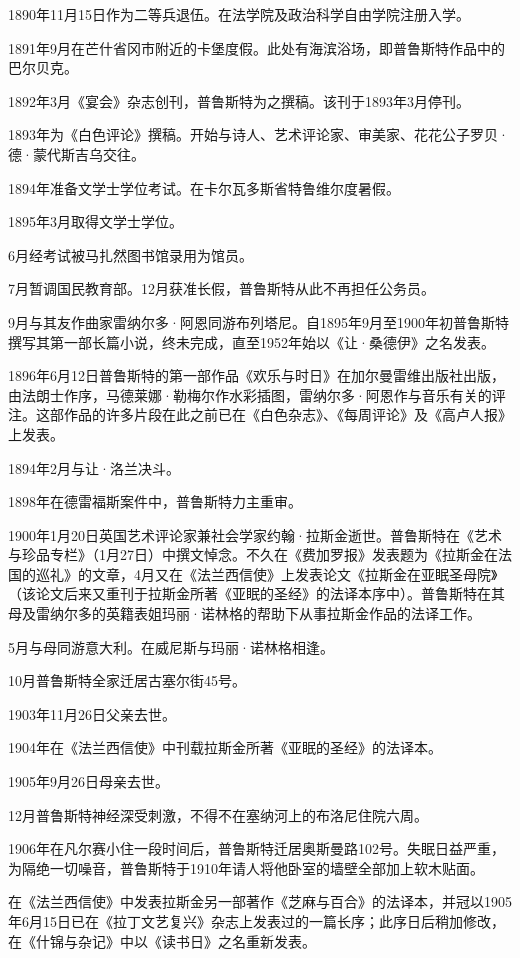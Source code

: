 \par 1890年11月15日作为二等兵退伍。在法学院及政治科学自由学院注册入学。
\par 1891年9月在芒什省冈市附近的卡堡度假。此处有海滨浴场，即普鲁斯特作品中的巴尔贝克。
\par 1892年3月《宴会》杂志创刊，普鲁斯特为之撰稿。该刊于1893年3月停刊。
\par 1893年为《白色评论》撰稿。开始与诗人、艺术评论家、审美家、花花公子罗贝·德·蒙代斯吉乌交往。
\par 1894年准备文学士学位考试。在卡尔瓦多斯省特鲁维尔度暑假。
\par 1895年3月取得文学士学位。
\par 6月经考试被马扎然图书馆录用为馆员。
\par 7月暂调国民教育部。12月获准长假，普鲁斯特从此不再担任公务员。
\par 9月与其友作曲家雷纳尔多·阿恩同游布列塔尼。自1895年9月至1900年初普鲁斯特撰写其第一部长篇小说，终未完成，直至1952年始以《让·桑德伊》之名发表。
\par 1896年6月12日普鲁斯特的第一部作品《欢乐与时日》在加尔曼雷维出版社出版，由法朗士作序，马德莱娜·勒梅尔作水彩插图，雷纳尔多·阿恩作与音乐有关的评注。这部作品的许多片段在此之前已在《白色杂志》、《每周评论》及《高卢人报》上发表。
\par 1894年2月与让·洛兰决斗。
\par 1898年在德雷福斯案件中，普鲁斯特力主重审。
\par 1900年1月20日英国艺术评论家兼社会学家约翰·拉斯金逝世。普鲁斯特在《艺术与珍品专栏》（1月27日）中撰文悼念。不久在《费加罗报》发表题为《拉斯金在法国的巡礼》的文章，4月又在《法兰西信使》上发表论文《拉斯金在亚眠圣母院》（该论文后来又重刊于拉斯金所著《亚眠的圣经》的法译本序中）。普鲁斯特在其母及雷纳尔多的英籍表姐玛丽·诺林格的帮助下从事拉斯金作品的法译工作。
\par 5月与母同游意大利。在威尼斯与玛丽·诺林格相逢。
\par 10月普鲁斯特全家迁居古塞尔街45号。
\par 1903年11月26日父亲去世。
\par 1904年在《法兰西信使》中刊载拉斯金所著《亚眠的圣经》的法译本。
\par 1905年9月26日母亲去世。
\par 12月普鲁斯特神经深受刺激，不得不在塞纳河上的布洛尼住院六周。
\par 1906年在凡尔赛小住一段时间后，普鲁斯特迁居奥斯曼路102号。失眠日益严重，为隔绝一切噪音，普鲁斯特于1910年请人将他卧室的墙壁全部加上软木贴面。
\par 在《法兰西信使》中发表拉斯金另一部著作《芝麻与百合》的法译本，并冠以1905年6月15日已在《拉丁文艺复兴》杂志上发表过的一篇长序；此序日后稍加修改，在《什锦与杂记》中以《读书日》之名重新发表。
